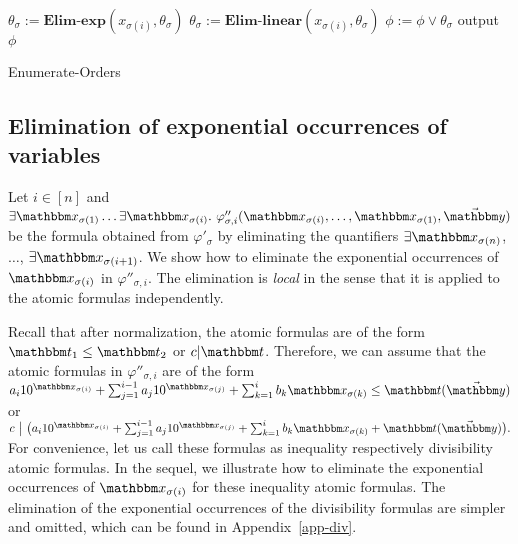 {\begin{algorithm}[t]
{        
        {
            $\theta_{\sigma}:= \textbf{Elim-exp}(x_{\sigma(i)},\theta_{\sigma})$\;
            $\theta_{\sigma}:= \textbf{Elim-linear}(x_{\sigma(i)},\theta_{\sigma})$\;
        }
        $\phi :=  \phi \vee \theta_{\sigma}$\;
    }
    output $\phi$
    \caption{Enumerate-Orders}
\end{algorithm}
}

\vspace*{-3mm}
\subsection{Elimination of  exponential occurrences of variables}\label{sec-elim-exp}

Let $i \in [n]$ and $\exists \ivarx_{\sigma(1)} \ldots \exists \ivarx_{\sigma(i)}.\ \varphi''_{\sigma,i}(\ivarx_{\sigma(i)}, \ldots, \ivarx_{\sigma(1)}, \vec{\ivary})$ be the formula obtained from $\varphi'_\sigma$ by eliminating the quantifiers $\exists \ivarx_{\sigma(n)}$, $\ldots$, $\exists \ivarx_{\sigma(i+1)}$. We show how to eliminate the exponential occurrences of $\ivarx_{\sigma(i)}$ in $\varphi''_{\sigma,i}$. The elimination is \emph{local} in the sense that it is applied to the atomic formulas independently. 

Recall that after normalization, the atomic formulas are of the form $\iterm_1 \le \iterm_2$ or $c | \iterm$. Therefore, we can assume that the atomic formulas in $\varphi''_{\sigma,i}$ are  of the form 
%
$a_i 10^{\ivarx_{\sigma(i)}}+\sum_{j=1}^{i-1} a_j 10^{\ivarx_{\sigma(j)}} + \sum_{k=1}^{i}b_k \ivarx_{\sigma(k)} \le \iterm(\vec{\ivary})$
or  
$c \ \big  | \ \big(a_i 10^{\ivarx_{\sigma(i)}}+\sum_{j=1}^{i-1} a_j 10^{\ivarx_{\sigma(j)}} + \sum_{k=1}^{i}b_k \ivarx_{\sigma(k)} + \iterm(\vec{\ivary})\big).$
%
For convenience, let us call these formulas as inequality respectively divisibility atomic formulas. In the sequel, we illustrate how to eliminate the exponential occurrences of $\ivarx_{\sigma(i)}$ for these inequality atomic formulas. The elimination of the exponential occurrences of the divisibility formulas are simpler and omitted, which can be found in Appendix~\ref{app-div}. 

